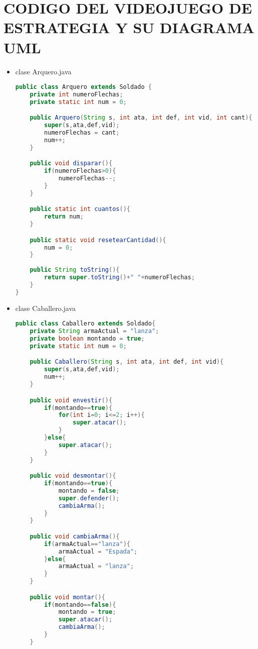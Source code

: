 \documentclass{article}
\begin{document}
    \section{CODIGO DEL VIDEOJUEGO DE ESTRATEGIA Y SU DIAGRAMA UML}
	\begin{itemize}

        \item clase Arquero.java
        \begin{lstlisting}[language=java]
public class Arquero extends Soldado {
    private int numeroFlechas;
    private static int num = 0;

    public Arquero(String s, int ata, int def, int vid, int cant){
        super(s,ata,def,vid);
        numeroFlechas = cant;
        num++;
    }

    public void disparar(){
        if(numeroFlechas>0){
            numeroFlechas--;
        }
    }

    public static int cuantos(){
        return num;
    }

    public static void resetearCantidad(){
        num = 0;
    }
    
    public String toString(){
        return super.toString()+" "+numeroFlechas;
    }
}
        \end{lstlisting}

        \item clase Caballero.java
        \begin{lstlisting}[language=java]
public class Caballero extends Soldado{
    private String armaActual = "lanza";
    private boolean montando = true;
    private static int num = 0;

    public Caballero(String s, int ata, int def, int vid){
        super(s,ata,def,vid);
        num++;
    }

    public void envestir(){
        if(montando==true){
            for(int i=0; i<=2; i++){
                super.atacar();
            }
        }else{
            super.atacar();
        }
    }

    public void desmontar(){
        if(montando==true){
            montando = false;
            super.defender();
            cambiaArma();
        }
    }

    public void cambiaArma(){
        if(armaActual=="lanza"){
            armaActual = "Espada";
        }else{
            armaActual = "lanza";
        }
    }

    public void montar(){
        if(montando==false){
            montando = true;
            super.atacar();
            cambiaArma();
        }
    }
    

\end{lstlisting}
\end{itemize}
\end{document}
